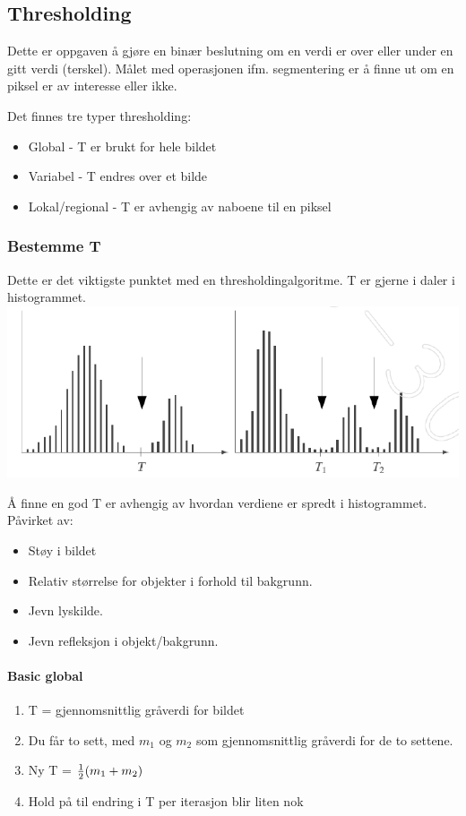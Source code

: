 \subsection{Thresholding}
Dette er oppgaven å gjøre en binær beslutning om en verdi er over eller under en gitt verdi (terskel). Målet med operasjonen ifm. segmentering er å finne ut om en piksel er av interesse eller ikke.

Det finnes tre typer thresholding:
\begin{itemize}
    \item Global - T er brukt for hele bildet
    \item Variabel - T endres over et bilde
    \item Lokal/regional - T er avhengig av naboene til en piksel
\end{itemize}

\subsubsection{Bestemme T}
Dette er det viktigste punktet med en thresholdingalgoritme. T er gjerne i daler i histogrammet.
\\ \includegraphics[width=\textwidth]{Bilder/thresholdhist.png}

Å finne en god T er avhengig av hvordan verdiene er spredt i histogrammet. Påvirket av:
\begin{itemize}
    \item Støy i bildet
    \item Relativ størrelse for objekter i forhold til bakgrunn.
    \item Jevn lyskilde.
    \item Jevn refleksjon i objekt/bakgrunn.
\end{itemize}

\paragraph{Basic global}
\begin{enumerate}
    \item T = gjennomsnittlig gråverdi for bildet
    \item Du får to sett, med $m_1$ og $m_2$ som gjennomsnittlig gråverdi for de to settene.
    \item Ny T = ${1 \over 2}(m_1 + m_2)$
    \item Hold på til endring i T per iterasjon blir liten nok
\end{enumerate}

